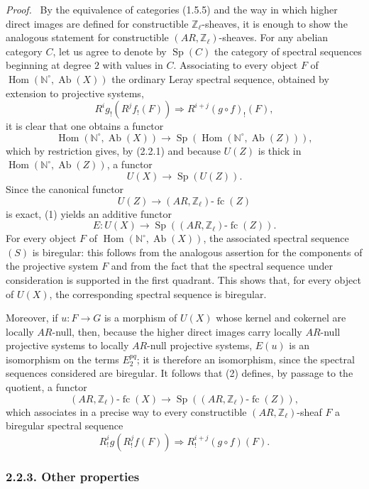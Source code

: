 \documentclass[11pt]{article}
\newenvironment{prooftext}[1][Proof]{\par\noindent\emph{#1.}\ }{\par\medskip}
\DeclareMathOperator{\Hom}{Hom}
\providecommand{\Hom}{\operatorname{Hom}}
\providecommand{\Sp}{\operatorname{Sp}}
\providecommand{\Ab}{\operatorname{Ab}}
\providecommand{\fc}{\operatorname{fc}}
\begin{document}
\begin{prooftext}[Proof]
By the equivalence of categories (1.5.5) and the way in which higher direct images are defined for constructible \(\mathbb Z_\ell\)-sheaves, it is enough to show the analogous statement for constructible \((AR,\mathbb Z_\ell)\)-sheaves. For any abelian category \(C\), let us agree to denote by \(\Sp(C)\) the category of spectral sequences beginning at degree \(2\) with values in \(C\). Associating to every object \(F\) of \(\Hom(\mathbb N^\circ,\Ab(X))\) the ordinary Leray spectral sequence, obtained by extension to projective systems,
\[
R^i g_!(R^j f_!(F))\Longrightarrow R^{i+j}(g\circ f)_!(F),
\tag{S}
\]
it is clear that one obtains a functor
\[
\Hom(\mathbb N^\circ,\Ab(X))\longrightarrow \Sp(\Hom(\mathbb N^\circ,\Ab(Z))),
\]
which by restriction gives, by (2.2.1) and because \(U(Z)\) is thick in \(\Hom(\mathbb N^\circ,\Ab(Z))\), a functor
\[
U(X)\longrightarrow \Sp(U(Z)).
\tag{1}
\]
Since the canonical functor
\[
U(Z)\longrightarrow (AR,\mathbb Z_\ell)\text{-}\fc(Z)
\]
is exact, (1) yields an additive functor
\[
E:U(X)\longrightarrow \Sp((AR,\mathbb Z_\ell)\text{-}\fc(Z)).
\tag{2}
\]
For every object \(F\) of \(\Hom(\mathbb N^\circ,\Ab(X))\), the associated spectral sequence \((S)\) is biregular: this follows from the analogous assertion for the components of the projective system \(F\) and from the fact that the spectral sequence under consideration is supported in the first quadrant. This shows that, for every object of \(U(X)\), the corresponding spectral sequence is biregular.

Moreover, if \(u:F\to G\) is a morphism of \(U(X)\) whose kernel and cokernel are locally \(AR\)-null, then, because the higher direct images carry locally \(AR\)-null projective systems to locally \(AR\)-null projective systems, \(E(u)\) is an isomorphism on the terms \(E_2^{pq}\); it is therefore an isomorphism, since the spectral sequences considered are biregular. It follows that (2) defines, by passage to the quotient, a functor
\[
(AR,\mathbb Z_\ell)\text{-}\fc(X)
\longrightarrow \Sp((AR,\mathbb Z_\ell)\text{-}\fc(Z)),
\tag{3}
\]
which associates in a precise way to every constructible \((AR,\mathbb Z_\ell)\)-sheaf \(F\) a biregular spectral sequence
\[
R^i_!g(R^j_!f(F))\Longrightarrow R^{i+j}_!(g\circ f)(F).
\]
\end{prooftext}

\subsubsection*{2.2.3. Other properties}
\end{document}
